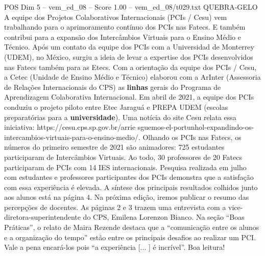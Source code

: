\begin{textsample}{POS Dim 5 – vem\_ed\_08 – Score 1.00 – vem\_ed\_08/t029.txt}  \label{ex:f5_pos_148}
QUEBRA-GELO A equipe dos Projetos Colaborativos Internacionais (PCIs / Cesu) vem trabalhando para o aprimoramento contínuo dos PCIs nas Fatecs.
E também contribui para a expansão dos Intercâmbios Virtuais para o Ensino Médio e Técnico.
Após um contato da equipe dos PCIs com a Universidad de Monterrey (UDEM), no México, surgiu a ideia de levar a expertise dos PCIs desenvolvidos nas Fatecs também para as Etecs.
Com a orientação da equipe dos PCIs / Cesu, a Cetec (Unidade de Ensino Médio e Técnico) elaborou com a ArInter (Assessoria de Relações Internacionais do CPS) as \textbf{linhas} gerais do Programa de Aprendizagem Colaborativa Internacional.
Em abril de 2021, a equipe dos PCIs conduziu o projeto piloto entre Etec Jaraguá e PREPA UDEM (escolas preparatórias para a \textbf{universidade}).
Uma notícia do site Cesu relata essa iniciativa: https://cesu.cps.sp.gov.br/arrie sguemos-el-portunhol-expandindo-os-intercambios-virtuais-para-o-ensino-medio/.
Olhando os PCIs nas Fatecs, os números do primeiro semestre de 2021 são animadores: 725 estudantes participaram de Intercâmbios Virtuais.
Ao todo, 30 professores de 20 Fatecs participaram de PCIs com 14 IES internacionais.
Pesquisa realizada em julho com estudantes e professores participantes dos PCIs demonstra que a satisfação com essa experiência é elevada.
A síntese dos principais resultados colhidos junto aos alunos está na página 4.
Na próxima edição, iremos publicar o resumo das percepções de docentes.
As páginas 2 e 3 trazem uma entrevista com a vice-diretora-superintendente do CPS, Emilena Lorenzon Bianco.
Na seção “Boas Práticas”, o relato de Maira Rezende destaca que a “comunicação entre os alunos e a organização do tempo” estão entre os principais desafios ao realizar um PCI.
Vale a pena encará-los pois “a experiência [... ] é incrível”.
Boa leitura!

\end{textsample}
